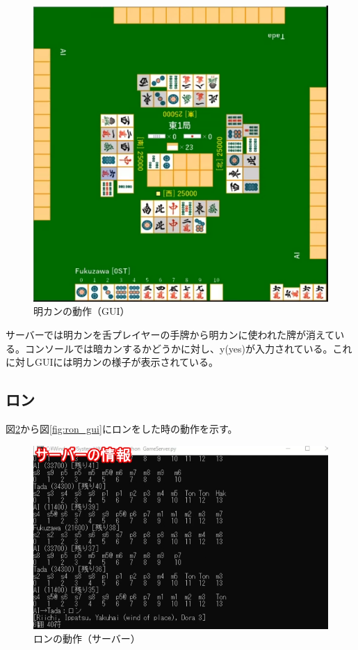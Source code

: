 \documentclass[a4j,titlepage]{jsarticle}
\begin{document}
\begin{figure}[H]
  \centering
  \includegraphics[scale = 0.8]{images/minkan_gui.png}
  \caption{明カンの動作（GUI）}
  \label{fig:minkan_gui}
\end{figure}

サーバーでは明カンを舌プレイヤーの手牌から明カンに使われた牌が消えている。コンソールでは暗カンするかどうかに対し、y(yes)が入力されている。これに対しGUIには明カンの様子が表示されている。

\subsection{ロン}
図\ref{fig:ron_server}から図\ref{fig:ron_gui}にロンをした時の動作を示す。

\begin{figure}[H]
  \centering
  \includegraphics[scale = 0.6]{images/ron_server.png}
  \caption{ロンの動作（サーバー）}
  \label{fig:ron_server}
\end{figure}
\end{document}
